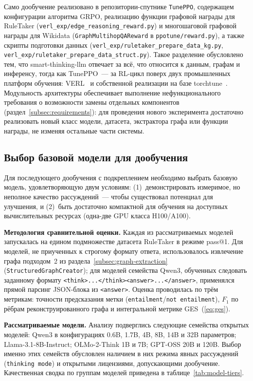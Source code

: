 Само дообучение реализовано в репозитории-спутнике \texttt{TunePPO}, содержащем конфигурации алгоритма GRPO, реализацию функции графовой награды для RuleTaker (\texttt{verl\_exp/edge\_reasoning\_reward.py}) и многошаговой графовой награды для Wikidata (\texttt{GraphMultihopQAReward} в \texttt{ppotune/reward.py}), а также скрипты подготовки данных (\texttt{verl\_exp/ruletaker\_prepare\_data\_kg.py}, \texttt{verl\_exp/ruletaker\_prepare\_data\_struct.py}). Такое разделение обусловлено тем, что smart-thinking-llm отвечает за всё, что относится к данным, графам и инференсу, тогда как TunePPO~--- за RL-цикл поверх двух промышленных платформ обучения: VERL~\cite{sheng2024verl} и собственной реализации на базе torchtune~\cite{torchtune2024}. Модульность архитектуры обеспечивает выполнение нефункционального требования о возможности замены отдельных компонентов (раздел~\ref{subsec:requirements}): для проведения нового эксперимента достаточно реализовать новый класс модели, датасета, экстрактора графа или функции награды, не изменяя остальные части системы.

\subsection{Выбор базовой модели для дообучения}
\label{subsec:model-selection}

Для последующего дообучения с подкреплением необходимо выбрать базовую модель, удовлетворяющую двум условиям: (1)~демонстрировать измеримое, но неполное качество рассуждений~--- чтобы существовал потенциал для улучшения, и (2)~быть достаточно компактной для обучения на доступных вычислительных ресурсах (одна-две GPU класса H100/A100).

\textbf{Методология сравнительной оценки.} Каждая из рассматриваемых моделей запускалась на едином подмножестве датасета RuleTaker в режиме pass@1. Для моделей, не приученных к строгому формату ответа, использовалось извлечение графа подходом~2 из раздела~\ref{subsec:graph-extraction} (\texttt{StructuredGraphCreator}); для моделей семейства Qwen3, обученных следовать заданному формату \texttt{<think>...</think><answer>...</answer>}, применялся прямой парсинг JSON-блока из \texttt{<answer>}. Оценка проводилась по трём метрикам: точности предсказания метки (\texttt{entailment}/\texttt{not entailment}), $F_1$ по рёбрам реконструированного графа и интегральной метрике GES~(\ref{eq:ges}).

\textbf{Рассматриваемые модели.} Анализу подверглись следующие семейства открытых моделей: Qwen3 в конфигурациях 0.6B, 1.7B, 4B, 8B, 14B и 32B параметров; Llama-3.1-8B-Instruct; OLMo-2-Think 1B и 7B; GPT-OSS 20B и 120B. Выбор именно этих семейств обусловлен наличием в них режима явных рассуждений (\texttt{thinking mode}) и открытыми лицензиями, допускающими дообучение. Качественная сводка по группам моделей приведена в таблице~\ref{tab:model-tiers}.

